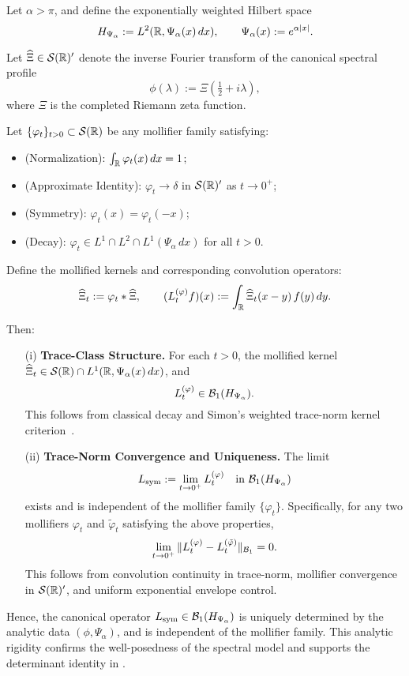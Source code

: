 \begin{lemma}
\label{lem:mollifier_independence_kernel_limit}
Let \( \alpha > \pi \), and define the exponentially weighted Hilbert space
\[
H_{\Psi_\alpha} := L^2(\mathbb{R}, \Psi_\alpha(x)\, dx), \qquad \Psi_\alpha(x) := e^{\alpha |x|}.
\]

Let \( \widehat{\Xi} \in \mathcal{S}(\mathbb{R})' \) denote the inverse Fourier transform of the canonical spectral profile
\[
\phi(\lambda) := \Xi\left( \tfrac{1}{2} + i\lambda \right),
\]
where \( \Xi \) is the completed Riemann zeta function.

Let \( \{\varphi_t\}_{t > 0} \subset \mathcal{S}(\mathbb{R}) \) be any mollifier family satisfying:
\begin{itemize}
  \item \textnormal{(Normalization)}: \( \int_{\mathbb{R}} \varphi_t(x)\, dx = 1 \);
  \item \textnormal{(Approximate Identity)}: \( \varphi_t \to \delta \) in \( \mathcal{S}(\mathbb{R})' \) as \( t \to 0^+ \);
  \item \textnormal{(Symmetry)}: \( \varphi_t(x) = \varphi_t(-x) \);
  \item \textnormal{(Decay)}: \( \varphi_t \in L^1 \cap L^2 \cap L^1(\Psi_\alpha\, dx) \) for all \( t > 0 \).
\end{itemize}

Define the mollified kernels and corresponding convolution operators:
\[
\widehat{\Xi}_t := \varphi_t * \widehat{\Xi}, \qquad
(L_t^{(\varphi)} f)(x) := \int_{\mathbb{R}} \widehat{\Xi}_t(x - y)\, f(y)\, dy.
\]

Then:

\begin{enumerate}
  \item[\textnormal{(i)}] \textbf{Trace-Class Structure.}  
  For each \( t > 0 \), the mollified kernel \( \widehat{\Xi}_t \in \mathcal{S}(\mathbb{R}) \cap L^1(\mathbb{R}, \Psi_\alpha(x)\, dx) \), and
  \[
  L_t^{(\varphi)} \in \mathcal{B}_1(H_{\Psi_\alpha}).
  \]
  This follows from classical decay and Simon’s weighted trace-norm kernel criterion~\cite[Ch.~4]{Simon2005TraceIdeals}.

  \item[\textnormal{(ii)}] \textbf{Trace-Norm Convergence and Uniqueness.}  
  The limit
  \[
  L_{\mathrm{sym}} := \lim_{t \to 0^+} L_t^{(\varphi)} \quad \text{in } \mathcal{B}_1(H_{\Psi_\alpha})
  \]
  exists and is independent of the mollifier family \( \{\varphi_t\} \). Specifically, for any two mollifiers \( \varphi_t \) and \( \tilde{\varphi}_t \) satisfying the above properties,
  \[
  \lim_{t \to 0^+} \| L_t^{(\varphi)} - L_t^{(\tilde{\varphi})} \|_{\mathcal{B}_1} = 0.
  \]
  This follows from convolution continuity in trace-norm, mollifier convergence in \( \mathcal{S}(\mathbb{R})' \), and uniform exponential envelope control.
\end{enumerate}

\noindent
Hence, the canonical operator \( L_{\mathrm{sym}} \in \mathcal{B}_1(H_{\Psi_\alpha}) \) is uniquely determined by the analytic data \( (\phi, \Psi_\alpha) \), and is independent of the mollifier family. This analytic rigidity confirms the well-posedness of the spectral model and supports the determinant identity in .
\end{lemma}
